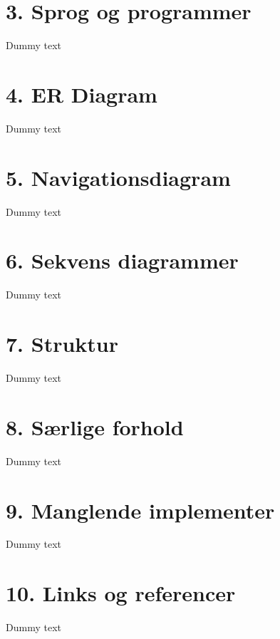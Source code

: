 \documentclass[11pt]{report}
\begin{document}
\newpage

\chapter*{3. Sprog og programmer}
Dummy text

\newpage

\chapter*{4. ER Diagram}
Dummy text

\newpage

\chapter*{5. Navigationsdiagram}
Dummy text

\newpage

\chapter*{6. Sekvens diagrammer}
Dummy text

\newpage

\chapter*{7. Struktur}
Dummy text

\newpage

\chapter*{8. Særlige forhold}
Dummy text

\newpage

\chapter*{9. Manglende implementer}
Dummy text

\newpage

\chapter*{10. Links og referencer}
Dummy text

\newpage
\end{document}
